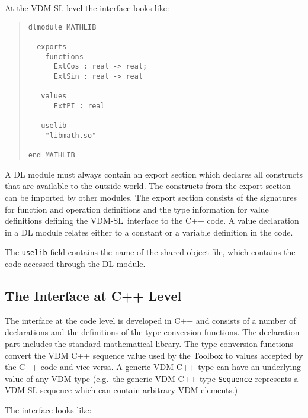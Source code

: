 \documentclass[\pformat,12pt]{article}
\newcommand{\vdmslpp}{VDM-SL}
\begin{document}
At the VDM-SL level the interface looks like:

\begin{quote}
\begin{verbatim}
dlmodule MATHLIB

  exports
    functions
      ExtCos : real -> real;
      ExtSin : real -> real   
      
   values   
      ExtPI : real
      
   uselib
    "libmath.so"

end MATHLIB
\end{verbatim}
\end{quote}

A DL module must always contain an export section which declares all
constructs that are available to the outside world.  The constructs
from the export section can be imported by other modules.  The export
section consists of the signatures for function and operation
definitions and the type information for value definitions defining
the \vdmslpp\ interface to the C++ code.  A value declaration in a DL
module relates either to a constant or a variable definition in the
code.

The {\tt uselib} field contains the name of the shared object file,
which contains the code accessed through the DL module.


\subsection*{The Interface at C++ Level}

The interface at the code level is developed in C++ and consists of a
number of declarations and the definitions of the type conversion
functions. The declaration part includes the standard mathematical
library.  The type conversion functions convert the VDM C++ sequence
value used by the Toolbox to values accepted by the C++ code and vice
versa.  A generic VDM C++ type can have an underlying value of any VDM
type (e.g.\ the generic VDM C++ type {\tt Sequence} represents a
VDM-SL sequence which can contain arbitrary VDM elements.)

The interface looks like:
\end{document}
